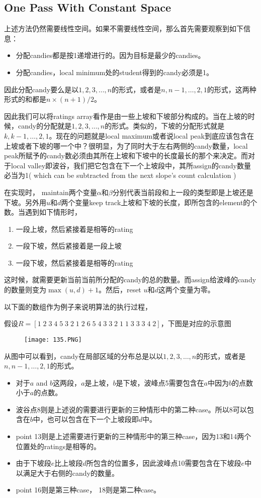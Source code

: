 \subsection{One Pass With Constant Space}
上述方法仍然需要线性空间。如果不需要线性空间，那么首先需要观察到如下信息：
\begin{itemize}
\item 分配candies都是按1递增进行的。因为目标是最少的candies。
\item 分配candies，local minimum处的student得到的candy必须是1。
\end{itemize}
因此分配candy要么是以$1,2,3,\ldots,n$的形式，或者是$n, n-1, \ldots, 2, 1$的形式，这两种形式的和都是$n\times(n+1)/2$。
\par
因此我们可以将ratings array看作是由一些上坡和下坡部分构成的。当在上坡的时候，candy的分配就是$1,2,3,\ldots,n$的形式。类似的，下坡的分配形式就是$k, k-1, \ldots, 2,1$。现在的问题就是local maximum或者说local peak到底应该包含在上坡或者下坡的哪一个中？很明显，为了同时大于左右两侧的candy数量，local peak所赋予的candy数必须由其所在上坡和下坡中的长度最长的那个来决定。而对于local valley即波谷，我们把它包含在下一个上坡段中，其所assign的candy数量必当为1( which can be subtracted from the next slope's count calculation )
\par
在实现时， maintain两个变量$\alpha$和$\beta$分别代表当前段和上一段的类型即是上坡还是下坡。另外用$u$和$d$两个变量keep track上坡和下坡的长度，即所包含的element的个数。当遇到如下情形时，
\begin{enumerate}
\item 一段上坡，然后紧接着是相等的rating
\item 一段下坡，然后紧接着是一段上坡
\item 一段下坡，然后紧接着是相等的rating
\end{enumerate}
这时候，就需要更新当前当前所分配的candy的总的数量。而assign给波峰的candy的数量则变为$\max(u,d)+1$。然后，reset $u$和$d$这两个变量为零。
\par
以下面的数组作为例子来说明算法的执行过程，
\par
假设$R=[1\;2\; 3\; 4\; 5\; 3\; 2\; 1\; 2\; 6\; 5\; 4\; 3\; 3\; 2\; 1\; 1\; 3\; 3\; 3\; 4\; 2]$，下图是对应的示意图
\begin{figure}[H]
\texttt{[image: 135.PNG]}
\end{figure}
从图中可以看到，candy在局部区域的分布总是以以$1,2,3,\ldots,n$的形式，或者是$n, n-1, \ldots, 2, 1$的形式。
\begin{itemize}
\item 对于$a$ and $b$这两段，$a$是上坡，$b$是下坡，波峰点5需要包含在$a$中因为$b$的点数小于$a$的点数。
\item 波谷点8则是上述说的需要进行更新的三种情形中的第二种case。所以8可以包含在$b$中，也可以包含在下一个上坡段即$d$中。
\item point 13则是上述需要进行更新的三种情形中的第三种case，因为13和14两个位置处的ratings是相等的。
\item 由于下坡段$e$比上坡段$d$所包含的位置多，因此波峰点10需要包含在下坡段$e$中以满足大于右侧的candy的数量。
\item point 16则是第三种case， 18则是第二种case。
\end{itemize}
